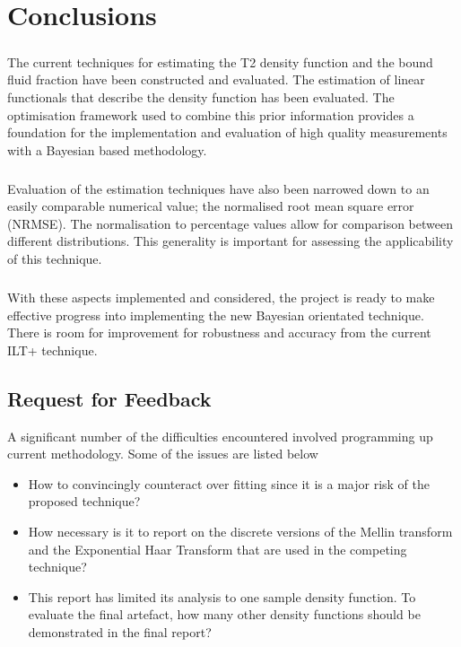\chapter{Conclusions}\label{C:con}
\paragraph{}
The current techniques for estimating the T2 density function and the bound fluid fraction have been constructed and evaluated. The estimation of linear functionals that describe the density function has been evaluated. The optimisation framework used to combine this prior information provides a foundation for the implementation and evaluation of high quality measurements with a Bayesian based methodology.
\paragraph{}
Evaluation of the estimation techniques have also been narrowed down to an easily comparable numerical value; the normalised root mean square error (NRMSE). The normalisation to percentage values allow for comparison between different distributions. This generality is important for assessing the applicability of this technique.
\paragraph{}
With these aspects implemented and considered, the project is ready to make effective progress into implementing the new Bayesian orientated technique. There is room for improvement for robustness and accuracy from the current ILT+ technique.

\section{Request for Feedback}
A significant number of the difficulties encountered involved programming up current methodology. Some of the issues are listed below
\begin{itemize}
    \item How to convincingly counteract over fitting since it is a major risk of the proposed technique?
    \item How necessary is it to report on the discrete versions of the Mellin transform and the Exponential Haar Transform that are used in the competing technique?
    \item This report has limited its analysis to one sample density function. To evaluate the final artefact, how many other density functions should be demonstrated in the final report?
    
\end{itemize}